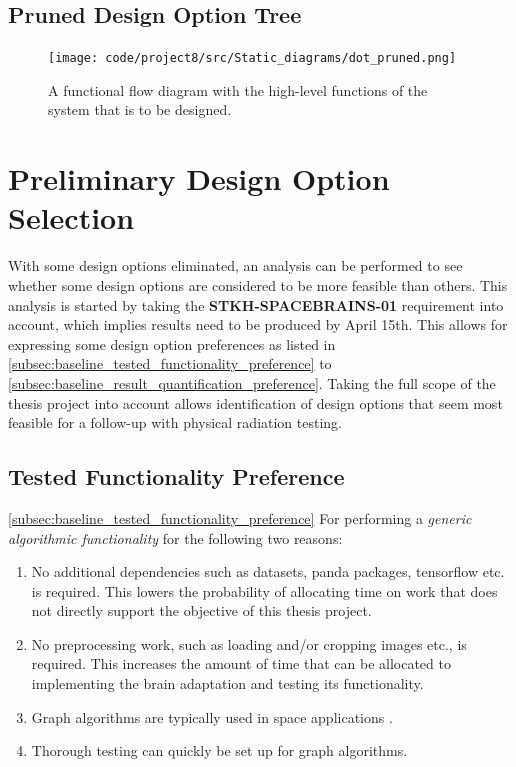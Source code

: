 \subsection{Pruned Design Option Tree}\label{subsec:baseline_pruned_dot}
\begin{figure}[H]
    \centering
    \texttt{[image: code/project8/src/Static\_diagrams/dot\_pruned.png]}
    \caption{A functional flow diagram with the high-level functions of the system that is to be designed.}
    \label{fig:baseline_dot}
\end{figure}


\section{Preliminary Design Option Selection}\label{sec:baseline_preliminary_design_option_selection}
With some design options eliminated, an analysis can be performed to see whether some design options are considered to be more feasible than others. This analysis is started by taking the \textbf{STKH-SPACEBRAINS-01} requirement into account, which implies results need to be produced by April 15th. This allows for expressing some design option preferences as listed in \cref{subsec:baseline_tested_functionality_preference} to \cref{subsec:baseline_result_quantification_preference}. Taking the full scope of the thesis project into account allows identification of design options that seem most feasible for a follow-up with physical radiation testing.

\subsection{Tested Functionality Preference}\cref{subsec:baseline_tested_functionality_preference}
For performing a \textit{generic algorithmic functionality} for the following two reasons:
\begin{enumerate}
    \item No additional dependencies such as datasets, panda packages, tensorflow etc. is required. This lowers the probability of allocating time on work that does not directly support the objective of this thesis project.
    \item No preprocessing work, such as loading and/or cropping images etc.,  is required. This increases the amount of time that can be allocated to implementing the brain adaptation and testing its functionality.
    \item Graph algorithms are typically used in space applications \cite{todo}.%
    \item Thorough testing can quickly be set up for graph algorithms.
\end{enumerate}
 
